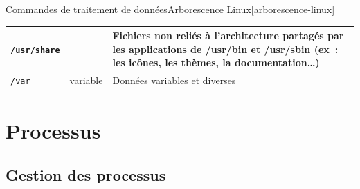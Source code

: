 \documentclass{beamer}
\begin{document}
\begin{frame}{Commandes de traitement de données}{Arborescence Linux\cref{arborescence-linux}}
\begin{tiny}
\begin{table}[h!]
\begin{tabular}{|l|p{3cm}|p{6cm}|}
                    \hline
                    \lstinline{/usr/share} &                         & Fichiers non reliés à l'architecture partagés par les applications de /usr/bin et /usr/sbin (ex~: les icônes, les thèmes, la documentation…)                                         \\
                    \hline
                    \lstinline{/var}       & variable                & Données variables et diverses                                                                                                                                                        \\
                    \hline
                \end{tabular}
            \end{table}
        \end{tiny}
    \end{frame}


    \section{Processus}\label{sec:processus}

    \subsection{Gestion des processus}\label{subsec:process-management}
\end{document}
